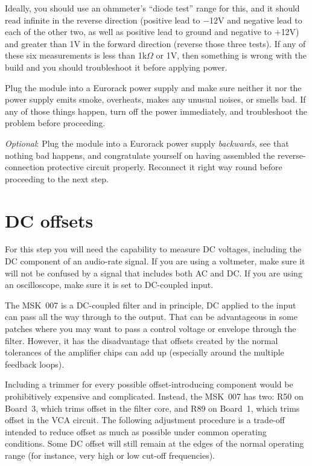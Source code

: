 Ideally, you should use an ohmmeter's
``diode test'' range for this, and it should read infinite in the reverse
direction (positive lead to $-$12V and negative lead to each of the other
two, as well as positive lead to ground and negative to $+$12V) and greater
than 1V in the forward direction (reverse those three tests).  If any of
these six measurements is less than 1k$\Omega$ or 1V, then something is
wrong with the build and you should troubleshoot it before applying power.

Plug the module into a Eurorack power supply and make sure
neither it nor the power supply emits smoke, overheats, makes any unusual
noises, or smells bad.  If any of those things happen, turn off the power
immediately, and troubleshoot the problem before proceeding.

\emph{Optional}: Plug the module into a Eurorack power supply
\emph{backwards}, see that nothing bad happens, and congratulate yourself on
having assembled the reverse-connection protective circuit properly. 
Reconnect it right way round before proceeding to the next step.

\section{DC offsets}

For this step you will need the capability to measure DC voltages, including
the DC component of an audio-rate signal.  If you are using a voltmeter,
make sure it will not be confused by a signal that includes both AC and DC. 
If you are using an oscilloscope, make sure it is set to DC-coupled input.

The MSK~007 is a DC-coupled filter and in principle, DC applied to the input
can pass all the way through to the output.  That can be advantageous in
some patches where you may want to pass a control voltage or envelope
through the filter.  However, it has the disadvantage that offsets created
by the normal tolerances of the amplifier chips can add up (especially
around the multiple feedback loops).

Including a trimmer for every possible offset-introducing component would be
prohibitively expensive and complicated.  Instead, the MSK~007 has two: R50
on Board~3, which trims offset in the filter core, and R89 on Board~1, which
trims offset in the VCA circuit.  The following adjustment procedure is a
trade-off intended to reduce offset as much as possible under common
operating conditions.  Some DC offset will still remain at the edges of the
normal operating range (for instance, very high or low cut-off frequencies).

